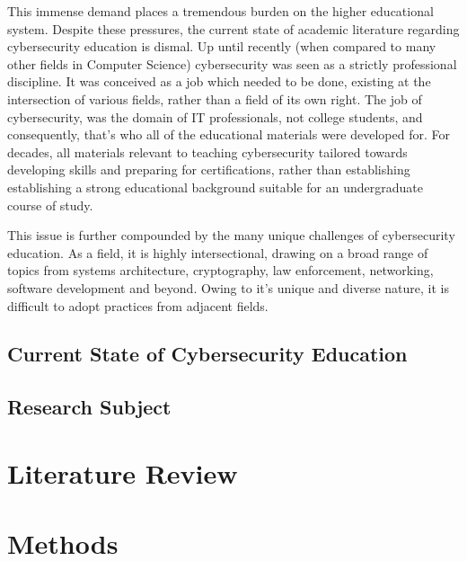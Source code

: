 \documentclass{article}
\begin{document}
    This immense demand places a tremendous burden on the higher educational system.
    Despite these pressures, the current state of academic literature regarding cybersecurity education is dismal. 
    Up until recently (when compared to many other fields in Computer Science) cybersecurity was seen as a strictly professional discipline. 
    It was conceived as a job which needed to be done, existing at the intersection of various fields, rather than a field of its own right.
    The job of cybersecurity, was the domain of IT professionals, not college students, and consequently, that's who all of the educational materials were developed for. 
    For decades, all materials relevant to teaching cybersecurity tailored towards developing skills and preparing for certifications, rather than establishing establishing a strong educational background suitable for an undergraduate course of study. 
    
    This issue is further compounded by the many unique challenges of cybersecurity education. 
    As a  field, it is highly intersectional, drawing on a broad range of topics from systems architecture, cryptography, law enforcement, networking, software development and beyond. 
    Owing to it's unique and diverse nature, it is difficult to adopt practices from adjacent fields. 

    \subsection{Current State of Cybersecurity Education} %


    \subsection{Research Subject} %


\section{Literature Review}


\section{Methods}
\end{document}
